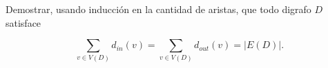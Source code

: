 \item\Obligatorio Demostrar, usando inducción en la cantidad de aristas, que todo digrafo $D$ satisface
%

   $$ \sum_{v \in V(D)} d_{in}(v) = \sum_{v \in V(D)} d_{out}(v) = |E(D)|. $$



